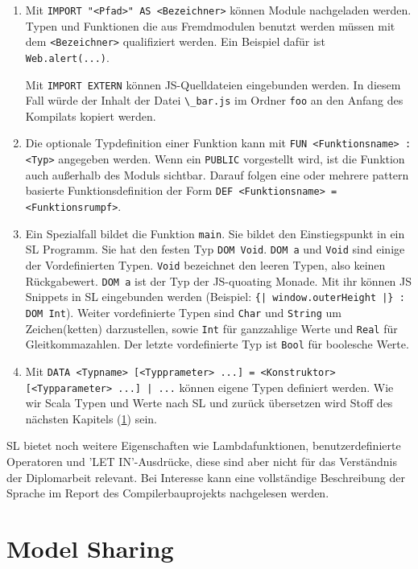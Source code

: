 \documentclass[12pt]{scrreprt}
\begin{document}
\begin{enumerate}
  \item Mit \lstinline!IMPORT "<Pfad>" AS <Bezeichner>! können Module nachgeladen werden. Typen und Funktionen die aus Fremdmodulen benutzt werden müssen mit dem \lstinline!<Bezeichner>! qualifiziert werden. Ein Beispiel dafür ist \lstinline!Web.alert(...)!. 
  
  Mit \lstinline!IMPORT EXTERN! können \ac{JS}-Quelldateien eingebunden werden. In diesem Fall würde der Inhalt der Datei \lstinline!\_bar.js! im Ordner \lstinline!foo! an den Anfang des Kompilats kopiert werden.
  \item Die optionale Typdefinition einer Funktion kann mit \lstinline!FUN <Funktionsname> : <Typ>! angegeben werden. Wenn ein \lstinline!PUBLIC! vorgestellt wird, ist die Funktion auch außerhalb des Moduls sichtbar. Darauf folgen eine oder mehrere pattern basierte Funktionsdefinition der Form \lstinline!DEF <Funktionsname> = <Funktionsrumpf>!.
  \item Ein Spezialfall bildet die Funktion \lstinline!main!. Sie bildet den Einstiegspunkt in ein \ac{SL} Programm. Sie hat den festen Typ \lstinline!DOM Void!. \lstinline!DOM a! und \lstinline!Void! sind einige der Vordefinierten Typen. \lstinline!Void! bezeichnet den leeren Typen, also keinen Rückgabewert. \lstinline!DOM a! ist der Typ der \ac{JS}-quoating Monade. Mit ihr können \ac{JS} Snippets in \ac{SL} eingebunden werden (Beispiel: \lstinline!{| window.outerHeight |} : DOM Int!). Weiter vordefinierte Typen sind \lstinline!Char! und \lstinline!String! um Zeichen(ketten) darzustellen, sowie \lstinline!Int! für ganzzahlige Werte und \lstinline!Real! für Gleitkommazahlen. Der letzte vordefinierte Typ ist \lstinline!Bool! für boolesche Werte.
  \item Mit \lstinline!DATA <Typname> [<Typprameter> ...] = <Konstruktor> [<Typparameter> ...] | ...! können eigene Typen definiert werden. Wie wir Scala Typen und Werte nach \ac{SL} und zurück übersetzen wird Stoff des nächsten Kapitels (\ref{cha:model-sharing}) sein.
\end{enumerate}

\ac{SL} bietet noch weitere Eigenschaften wie Lambdafunktionen, benutzerdefinierte Operatoren und 'LET IN'-Ausdrücke, diese sind aber nicht für das Verständnis der Diplomarbeit relevant. Bei Interesse kann eine vollständige Beschreibung der Sprache im Report des Compilerbauprojekts \cite{Bisping2013} nachgelesen werden.

\chapter{Model Sharing}
\label{cha:model-sharing}
\end{document}
